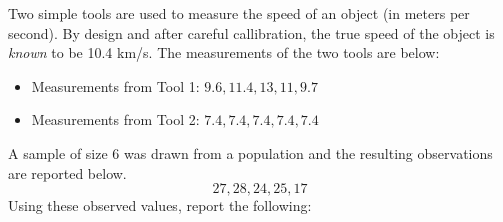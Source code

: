 \documentclass[addpoints]{examsetup}\usepackage[]{graphicx}\usepackage[]{color}
\begin{document}



\examCoverPage

\begin{questions}

\question



Two simple tools are used to measure the speed of an object (in meters per second). 
By design and after careful callibration, the true speed of the object is \textit{known} to be 10.4 km/s.
The measurements of the two tools are below: 

\begin{itemize}

   \item Measurements from Tool 1: $ 9.6, 11.4, 13, 11, 9.7 $ \\

   \item Measurements from Tool 2: $ 7.4, 7.4, 7.4, 7.4, 7.4 $ \\

\end{itemize}



\vspace{1cm}

\question 

A sample of size 6 was drawn from a population and the resulting observations are reported below. 
$$
   27, 28, 24, 25, 17
$$
Using these observed values, report the following:

\vspace{1cm}


\end{questions}
\end{document}
